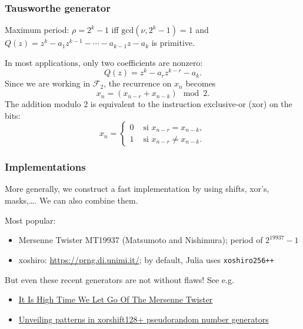 \documentclass{beamer}
\begin{document}
	\begin{frame}
		\frametitle{Tausworthe generator}
		
		{\blue Maximum period:} $\rho = 2^k-1$ iff $\mbox{gcd}(\nu, 2^k-1) = 1$ and ${Q(z)} = z^k - a_1 z^{k-1}	- \cdots - a_{k-1} z - a_k$ is primitive.
		
		\mbox{}
		
In most applications, only two coefficients are nonzero:
$$
Q(z) = z^k - a_r z^{k-r} - a_k.
$$
Since we are working in $\mathcal{F}_2$, the recurrence on $x_n$ becomes
$$
x_n = (x_{n-r}+x_{n-k}) \mod 2.
$$
The addition modulo 2 is equivalent to the instruction exclusive-or (xor) on the bits:
$$
x_n =
\begin{cases}
0 & \mbox{ si } x_{n-r} = x_{n-k},\\
1 & \mbox{ si } x_{n-r} \ne x_{n-k}.
\end{cases}
$$		

\end{frame}
	
	\begin{frame}[fragile]
		\frametitle{Implementations}
		
		More generally, we construct a fast implementation by using shifts,
		xor's, masks,\ldots. We can also combine them.
		
		\mbox{}
		
Most popular:
\begin{itemize}
	\item 
	Mersenne Twister MT19937 (Matsumoto and Nishimura); period of $2^{19937}-1$
	\item
	xoshiro: \url{https://prng.di.unimi.it/}; by default, Julia uses \verb|xoshiro256++|
\end{itemize}


\mbox{}

But even these recent generators are not without flaws! See e.g.
\begin{itemize}
	\item 
	\href{https://arxiv.org/abs/1910.06437}{It Is High Time We Let Go Of The Mersenne Twister}
	\item
	\href{https://www.sciencedirect.com/science/article/abs/pii/S0377042721004131}{Unveiling patterns in xorshift128+ pseudorandom number generators}
\end{itemize}
		
\end{frame}
\end{document}
